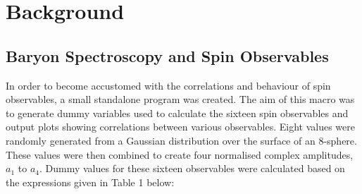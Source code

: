\documentclass[a4paper,12pt]{article}
\begin{document}
\section{Background}
\subsection{Baryon Spectroscopy and Spin Observables} 


In order to become accustomed with the correlations and behaviour of spin observables, a small standalone program was created.  The aim of this macro was to generate dummy variables used to calculate the sixteen spin observables and output plots showing correlations between various observables.
\newline
Eight values were randomly generated from a Gaussian distribution over the surface of an 8-sphere.  These values were then combined to create four normalised complex amplitudes, $a_{1}$ to $a_{4}$.  Dummy values for these sixteen observables were calculated based on the expressions given in Table 1 below:
\newline
\end{document}
